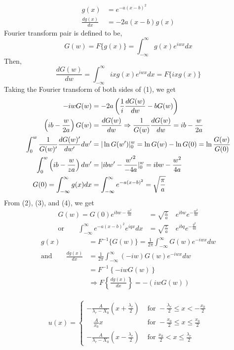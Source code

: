 \documentclass[letterpage]{article}
\begin{document}
\begin{align}
  g(x)&=e^{-a(x-b)^2}\\
  \frac{dg(x)}{dx}& = -2a(x-b)g(x)
\end{align}
Fourier transform pair is defined to be,
\begin{equation}
  G(w) = F\{g(x)\} = \int_{-\infty}^\infty g(x)e^{iwx}dx
\end{equation}
Then,
\begin{equation}
  \frac{dG(w)}{dw} = \int_{-\infty}^\infty ixg(x)e^{iwx}dx = F\{ixg(x)\}
\end{equation}
Taking the Fourier transform of both sides of (1), we get
\begin{align}
  -iwG(w) &= -2a \left(\frac{1}{i} \frac{dG(w)}{dw} - bG(w)\right)\\
  \left(ib-\frac{w}{2a}\right) G(w) &= \frac{dG(w)}{dw} \Rightarrow
  \frac{1}{G(w)} \frac{dG(w)}{dw} = ib-\frac{w}{2a}\\
  \int_0^w \frac{1}{G(w)'} \frac{dG(w)'}{dw'} dw' &= 
  \arrowvert\ln G(w')\arrowvert_0^w = \ln G(w) - \ln G(0) 
  = \ln \frac{G(w)}{G(0)}\\
  \int_0^w \left(ib-\frac{w}{za}\right)dw' &= \arrowvert ibw' - \frac{{w'}^2}{-4a}
  \arrowvert_0^w = ibw-\frac{w^2}{4a}\\
  G(0) = \int_{-\infty}^\infty g(x) dx &= \int_{-\infty}^\infty e^{-a(x-b)^2}
  = \sqrt{\frac{\pi}{a}}
\end{align}
From (2), (3), and (4), we get
\begin{align}
  G(w) = G(0) e^{ibw-\frac{w^2}{4a}} &= \sqrt{\frac{\pi}{a}} \quad e^{ibw} 
  e^{-\frac{w^2}{4a}}\\
  \text{or} \qquad
  \int_{-\infty}^\infty e^{-a(x-b)^2} e^{iqx}dx &= \sqrt{\frac{\pi}{a}}
  \quad e^{ibq} e^{-\frac{q^2}{4a}}
\end{align}
\begin{align}
  g(x) &= F^{-1} \{G(w)\} = \frac{1}{2\pi} \int_{-\infty}^\infty 
  G(w)e^{-iwx}dw\\
  \text{and} \qquad \frac{dg(x)}{dx} &= \frac{1}{2\pi} \int_{-\infty}^\infty
  (-iw)G(w)e^{-iwx}dw\\
  &=F^{-1} \left\{-iwG(w)\right\}\\
  &\Rightarrow F\left\{\frac{dg(x)}{dx} \right\} = -(iwG(w))
\end{align}
\\
\begin{equation*}
  u(x) = 
    \begin{cases}
    -\frac{A}{\lambda_r - X_0} \left(x+\frac{\lambda_r}{2}\right) 
     &\text{ for } 
    -\frac{\lambda_r}{2} \leq x < -\frac{x_0}{2}\\
    \quad \frac{A}{x_0}x &\text{ for } 
    -\frac{x_0}{2} \leq x \leq \frac{x_0}{2}\\
    -\frac{A}{\lambda_r-X_0} \left(x-\frac{\lambda_r}{2}\right)
    &\text{ for } 
   \frac{x_0}{2} < x \leq \frac{\lambda_r}{2}
    \end{cases}
\end{equation*}
\end{document}
